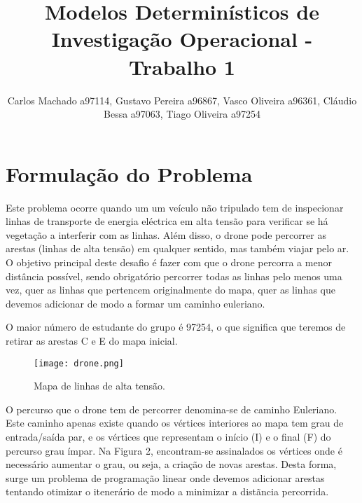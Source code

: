 \documentclass[runningheads]{llncs}
\begin{document}
%
    \title{Modelos Determinísticos de Investigação Operacional - Trabalho 1}
    \author{Carlos Machado a97114, Gustavo Pereira a96867,
        Vasco Oliveira a96361, Cláudio Bessa a97063, Tiago Oliveira a97254}





    \maketitle
    \newpage
    \section{Formulação do Problema}


    Este problema ocorre quando um um veículo não tripulado tem de inspecionar linhas de transporte de energia eléctrica em alta tensão para verificar se há vegetação a interferir com as linhas. Além disso, o drone pode percorrer as arestas (linhas de alta tensão) em qualquer sentido, mas também viajar pelo ar. O objetivo principal deste desafio é fazer com que o drone percorra a menor distância possível, sendo obrigatório percorrer todas as linhas pelo menos uma vez, quer as linhas que pertencem originalmente do mapa, quer as linhas que devemos adicionar de modo a formar um caminho euleriano.

    O maior número de estudante do grupo é 97254, o que significa que teremos de retirar as arestas C e E do mapa inicial.

    \begin{figure}[h]
        \centering
        \texttt{[image: drone.png]}
        \caption{Mapa de linhas de alta tensão.}
        \label{fig:data1}
    \end{figure}

    O percurso que o drone tem de percorrer denomina-se de caminho Euleriano. Este caminho apenas existe quando os vértices interiores ao mapa tem grau de entrada/saída par, e os vértices que representam o início (I) e o final (F) do percurso grau ímpar. Na Figura 2, encontram-se assinalados os vértices onde é necessário aumentar o grau, ou seja, a criação de novas arestas. Desta forma, surge um problema de programação linear onde devemos adicionar arestas tentando otimizar o itenerário de modo a minimizar a distãncia percorrida.
\end{document}
